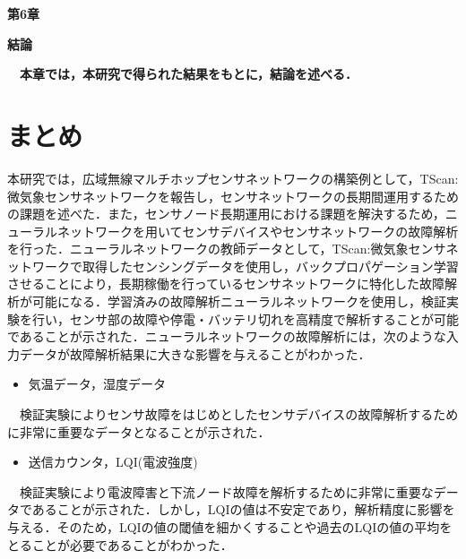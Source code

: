 \newpage
\setcounter{chapter}{6}
\setcounter{section}{0}

\begin{center}	
\vspace{0.5cm}
\huge{\bf 第6章}
\par
\vspace{1cm}
\hrulefill
\par
\vspace{1cm}
\huge{\bf 結論}
\par
\vspace{0.5cm}
\hrulefill
\vspace{1cm}
\par

\begin{flushleft}
\large{{\bf　本章では，本研究で得られた結果をもとに，結論を述べる．}}
\end{flushleft}
\end{center}

\newpage

\section{まとめ}
本研究では，広域無線マルチホップセンサネットワークの構築例として，TScan:微気象センサネットワークを報告し，センサネットワークの長期間運用するための課題を述べた．また，センサノード長期運用における課題を解決するため，ニューラルネットワークを用いてセンサデバイスやセンサネットワークの故障解析を行った．ニューラルネットワークの教師データとして，TScan:微気象センサネットワークで取得したセンシングデータを使用し，バックプロパゲーション学習させることにより，長期稼働を行っているセンサネットワークに特化した故障解析が可能になる．学習済みの故障解析ニューラルネットワークを使用し，検証実験を行い，センサ部の故障や停電・バッテリ切れを高精度で解析することが可能であることが示された．ニューラルネットワークの故障解析には，次のような入力データが故障解析結果に大きな影響を与えることがわかった．
\begin{itemize}
\item 気温データ，湿度データ
\end{itemize}
　検証実験によりセンサ故障をはじめとしたセンサデバイスの故障解析するために非常に重要なデータとなることが示された．
\begin{itemize}
\item 送信カウンタ，LQI(電波強度)
\end{itemize}
　検証実験により電波障害と下流ノード故障を解析するために非常に重要なデータであることが示された．しかし，LQIの値は不安定であり，解析精度に影響を与える．そのため，LQIの値の閾値を細かくすることや過去のLQIの値の平均をとることが必要であることがわかった．\\

